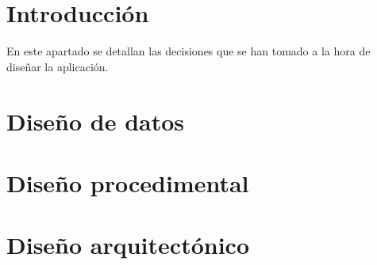 
\section{Introducción}
En este apartado se detallan las decisiones que se han tomado a la hora de diseñar la aplicación.

\section{Diseño de datos}

\section{Diseño procedimental}

\section{Diseño arquitectónico}